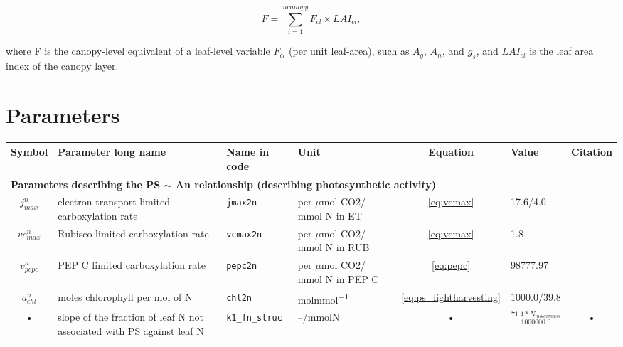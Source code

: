 \begin{equation}
F = \sum_{i=1}^{ncanopy} F_{cl} \times LAI_{cl},
\end{equation}

where F is the canopy-level equivalent of a leaf-level variable $F_{cl}$ (per unit leaf-area), such as $A_g$, $A_n$, and $g_s$, and $LAI_{cl}$ is the leaf area index of the canopy layer. 



\begin{table}
\section{Parameters}\label{tab:assimi:param}

\begin{tabularx}{\linewidth}{|c|X|l|l|c|X|c|} %
\hline 
Symbol & Parameter long name & Name in code & Unit & Equation & Value & Citation \\ 
\hline 
\multicolumn{6}{l}{\bf Parameters describing the PS $\sim$ An relationship (describing photosynthetic activity)}\\
\hline
$j_{max}^n$ & electron-transport limited carboxylation rate & \texttt{jmax2n} & per $\mu$mol CO2/ mmol N in ET & \ref{eq:vcmax} & 17.6/4.0 & \cite{Niinemets:1997ha} \\
$vc_{max}^n$ & Rubisco limited carboxylation rate & \texttt{vcmax2n} & per $\mu$mol CO2/ mmol N in RUB & \ref{eq:vcmax}  & 1.8 & \cite{Niinemets:1997ha} \\ 
$v_{pepc}^n$ & PEP C limited carboxylation rate & \texttt{pepc2n} & per $\mu$mol CO2/ mmol N in PEP C & \ref{eq:pepc} & 98777.97 & \cite{Tazoe:2006hc} \\ 
$a_{chl}^n$ & moles chlorophyll per mol of N & \texttt{chl2n} & \unit{molmmol^{-1}} & \ref{eq:ps_lightharvesting} & $1000.0/39.8$ & \cite{Evans:1989bg} \\ 
• & slope of the fraction of leaf N not associated with PS against leaf N & \texttt{k1\_fn\_struc} & --/mmolN & • & $\frac{71.4 * N_{molar mass}}{1000000.0}$ & • \\ 
\hline 
\end{tabularx}
\end{table}


